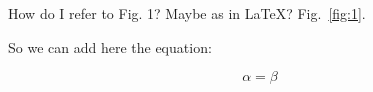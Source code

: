 How do I refer to Fig. 1? Maybe as in \LaTeX? Fig.~\ref{fig:1}. 

So we can add here the equation:

\begin{equation}\label{eq:1}
\alpha = \beta
\end{equation}


  